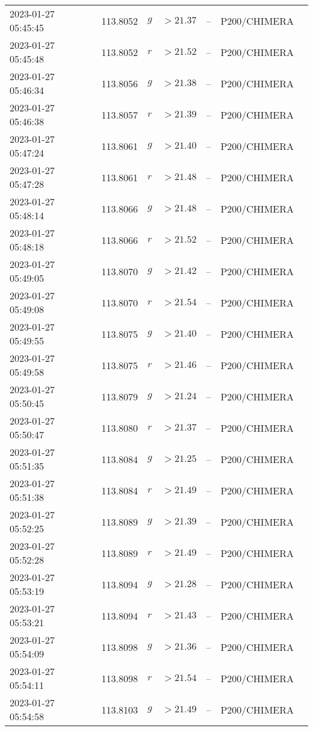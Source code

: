 \documentclass{nature_plusfigure}
\begin{document}
\begin{supplement}
\begin{center}
\begin{longtable}{lllllll}
2023-01-27 05:45:45 & 113.8052 & $g$ & $>21.37$ & -- & P200/CHIMERA &  \\ 
2023-01-27 05:45:48 & 113.8052 & $r$ & $>21.52$ & -- & P200/CHIMERA &  \\ 
2023-01-27 05:46:34 & 113.8056 & $g$ & $>21.38$ & -- & P200/CHIMERA &  \\ 
2023-01-27 05:46:38 & 113.8057 & $r$ & $>21.39$ & -- & P200/CHIMERA &  \\ 
2023-01-27 05:47:24 & 113.8061 & $g$ & $>21.40$ & -- & P200/CHIMERA &  \\ 
2023-01-27 05:47:28 & 113.8061 & $r$ & $>21.48$ & -- & P200/CHIMERA &  \\ 
2023-01-27 05:48:14 & 113.8066 & $g$ & $>21.48$ & -- & P200/CHIMERA &  \\ 
2023-01-27 05:48:18 & 113.8066 & $r$ & $>21.52$ & -- & P200/CHIMERA &  \\ 
2023-01-27 05:49:05 & 113.8070 & $g$ & $>21.42$ & -- & P200/CHIMERA &  \\ 
2023-01-27 05:49:08 & 113.8070 & $r$ & $>21.54$ & -- & P200/CHIMERA &  \\ 
2023-01-27 05:49:55 & 113.8075 & $g$ & $>21.40$ & -- & P200/CHIMERA &  \\ 
2023-01-27 05:49:58 & 113.8075 & $r$ & $>21.46$ & -- & P200/CHIMERA &  \\ 
2023-01-27 05:50:45 & 113.8079 & $g$ & $>21.24$ & -- & P200/CHIMERA &  \\ 
2023-01-27 05:50:47 & 113.8080 & $r$ & $>21.37$ & -- & P200/CHIMERA &  \\ 
2023-01-27 05:51:35 & 113.8084 & $g$ & $>21.25$ & -- & P200/CHIMERA &  \\ 
2023-01-27 05:51:38 & 113.8084 & $r$ & $>21.49$ & -- & P200/CHIMERA &  \\ 
2023-01-27 05:52:25 & 113.8089 & $g$ & $>21.39$ & -- & P200/CHIMERA &  \\ 
2023-01-27 05:52:28 & 113.8089 & $r$ & $>21.49$ & -- & P200/CHIMERA &  \\ 
2023-01-27 05:53:19 & 113.8094 & $g$ & $>21.28$ & -- & P200/CHIMERA &  \\ 
2023-01-27 05:53:21 & 113.8094 & $r$ & $>21.43$ & -- & P200/CHIMERA &  \\ 
2023-01-27 05:54:09 & 113.8098 & $g$ & $>21.36$ & -- & P200/CHIMERA &  \\ 
2023-01-27 05:54:11 & 113.8098 & $r$ & $>21.54$ & -- & P200/CHIMERA &  \\ 
2023-01-27 05:54:58 & 113.8103 & $g$ & $>21.49$ & -- & P200/CHIMERA &  \\ 

\end{longtable}
\end{center}
\end{supplement}
\end{document}
